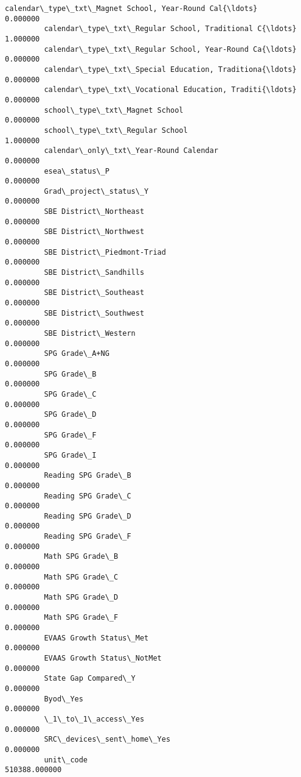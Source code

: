 \documentclass[11pt]{article}
\begin{document}
\begin{Verbatim}[commandchars=\\\{\}]
         calendar\_type\_txt\_Magnet School, Year-Round Cal{\ldots}       0.000000   
         calendar\_type\_txt\_Regular School, Traditional C{\ldots}       1.000000   
         calendar\_type\_txt\_Regular School, Year-Round Ca{\ldots}       0.000000   
         calendar\_type\_txt\_Special Education, Traditiona{\ldots}       0.000000   
         calendar\_type\_txt\_Vocational Education, Traditi{\ldots}       0.000000   
         school\_type\_txt\_Magnet School                            0.000000   
         school\_type\_txt\_Regular School                           1.000000   
         calendar\_only\_txt\_Year-Round Calendar                    0.000000   
         esea\_status\_P                                            0.000000   
         Grad\_project\_status\_Y                                    0.000000   
         SBE District\_Northeast                                   0.000000   
         SBE District\_Northwest                                   0.000000   
         SBE District\_Piedmont-Triad                              0.000000   
         SBE District\_Sandhills                                   0.000000   
         SBE District\_Southeast                                   0.000000   
         SBE District\_Southwest                                   0.000000   
         SBE District\_Western                                     0.000000   
         SPG Grade\_A+NG                                           0.000000   
         SPG Grade\_B                                              0.000000   
         SPG Grade\_C                                              0.000000   
         SPG Grade\_D                                              0.000000   
         SPG Grade\_F                                              0.000000   
         SPG Grade\_I                                              0.000000   
         Reading SPG Grade\_B                                      0.000000   
         Reading SPG Grade\_C                                      0.000000   
         Reading SPG Grade\_D                                      0.000000   
         Reading SPG Grade\_F                                      0.000000   
         Math SPG Grade\_B                                         0.000000   
         Math SPG Grade\_C                                         0.000000   
         Math SPG Grade\_D                                         0.000000   
         Math SPG Grade\_F                                         0.000000   
         EVAAS Growth Status\_Met                                  0.000000   
         EVAAS Growth Status\_NotMet                               0.000000   
         State Gap Compared\_Y                                     0.000000   
         Byod\_Yes                                                 0.000000   
         \_1\_to\_1\_access\_Yes                                       0.000000   
         SRC\_devices\_sent\_home\_Yes                                0.000000   
         unit\_code                                           510388.000000   
         

\end{Verbatim}
\end{document}

